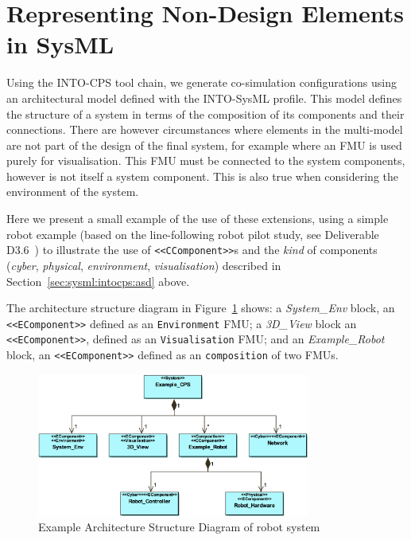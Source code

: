 \section{Representing Non-Design Elements in SysML}
\label{sec:sysml:non-design}

Using the INTO-CPS tool chain, we generate co-simulation configurations using an architectural model defined with the INTO-SysML profile. This model defines the structure of a system in terms of the composition of its components and their connections. There are however circumstances where elements in the multi-model are not part of the design of the final system, for example where an FMU is used purely for visualisation. This FMU must be connected to the system components, however is not itself a system component. This is also true when considering the environment of the system.

Here we present a small example of the use of these extensions, using a simple robot example (based on the line-following robot pilot study, see Deliverable D3.6~\cite{INTOCPSD3.6}) to illustrate the use of \texttt{<<CComponent>>}s and the \emph{kind} of components (\emph{cyber}, \emph{physical}, \emph{environment}, \emph{visualisation}) described in Section~\ref{sec:sysml:intocps:asd} above.

The architecture structure diagram in Figure~\ref{fig:example_asd} shows: a \emph{System\_Env} block, an \texttt{<<EComponent>>} defined as an \texttt{Environment} FMU; a \emph{3D\_View} block an \texttt{<<EComponent>>}, defined as an \texttt{Visualisation} FMU; and an \emph{Example\_Robot} block, an \texttt{<<EComponent>>} defined as an \texttt{composition} of two FMUs.

\begin{figure}
\centering
\includegraphics[width=0.8\textwidth]{figures/E_Blocks_ext_asd}
\caption{Example Architecture Structure Diagram of robot system}
\label{fig:example_asd}
\end{figure}

